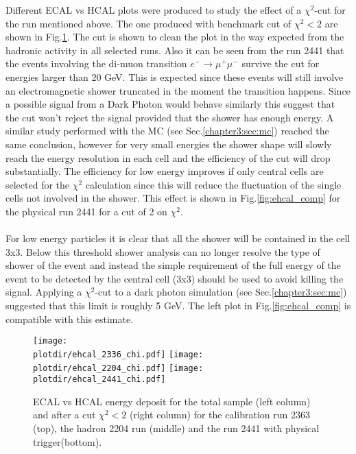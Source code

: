 \clearpage

Different ECAL vs HCAL plots were produced to study the effect of a
$\chi^2$-cut for the run mentioned above. The one produced with
benchmark cut of $\chi^2 < 2$ are shown in
Fig.\ref{fig:ehcal_test}. The cut is shown to clean the plot in the
way expected from the hadronic activity in all selected runs. Also it
can be seen from the run 2441 that the events involving the di-muon
transition $e^- \to \mu^+\mu^-$ survive the cut for energies larger
than 20 GeV.  This is expected since these events will still involve
an electromagnetic shower truncated in the moment the transition
happens. Since a possible signal from a Dark Photon would behave
similarly this suggest that the cut won't reject the signal provided
that the shower has enough energy. A similar study performed with the
MC (see Sec.\ref{chapter3:sec:mc}) reached the same conclusion, however for
very small energies the shower shape will slowly reach the energy
resolution in each cell and the efficiency of the cut will drop
substantially.  The efficiency for low energy improves if only central
cells are selected for the $\chi^2$ calculation since this will reduce
the fluctuation of the single cells not involved in the shower. This
effect is shown in Fig.\ref{fig:ehcal_comp} for the physical run 2441
for a cut of 2 on $\chi^2$.
\\
\\
For low energy particles it is clear that all the shower will be
contained in the cell 3x3. Below this threshold shower analysis can no
longer resolve the type of shower of the event and instead the simple
requirement of the full energy of the event to be detected by the
central cell (3x3) should be used to avoid killing the
signal. Applying a $\chi^2$-cut to a dark photon simulation (see
Sec.\ref{chapter3:sec:mc}) suggested that this limit is roughly 5 GeV.  The
left plot in Fig.\ref{fig:ehcal_comp} is compatible with this
estimate.


\newpage
\begin{figure}[h!]
  \begin{center}
    \texttt{[image: \\plotdir/ehcal\_2336\_chi.pdf]}
    \texttt{[image: \\plotdir/ehcal\_2204\_chi.pdf]}
    \texttt{[image: \\plotdir/ehcal\_2441\_chi.pdf]}
  \end{center}
  \caption{ECAL vs HCAL energy deposit for the total sample (left
    column) and after a cut $\chi^2<2$ (right column) for the
    calibration run 2363 (top), the hadron 2204 run (middle) and the run
    2441 with physical trigger(bottom).}
  \label{fig:ehcal_test}
\end{figure}
\clearpage

